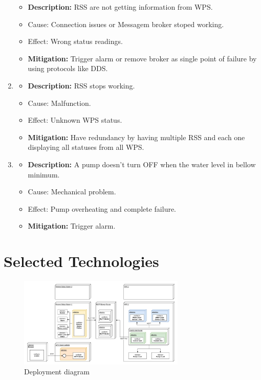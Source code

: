 \documentclass[11pt]{article}
\begin{document}
\begin{enumerate}[leftmargin=4em, font=\small, label=\textbf{H-\arabic*:}]
		\begin{itemize}
		\setlength\itemsep{0em}
    		\item \textbf{Description:} RSS are not getting information from WPS.
		\item Cause: Connection issues or Messagem broker stoped working.
    		\item Effect: Wrong status readings.
    		\item \textbf{Mitigation:} Trigger alarm or remove broker as single point of failure by using protocols like DDS.
		\end{itemize} 
	\item 
		\begin{itemize}
		\setlength\itemsep{0em}
    		\item \textbf{Description:} RSS stops working.
		\item Cause: Malfunction.
    		\item Effect: Unknown WPS status.
    		\item \textbf{Mitigation:} Have redundancy by having multiple RSS and each one displaying all statuses from all WPS.
		\end{itemize} 
	\item 
		\begin{itemize}
		\setlength\itemsep{0em}
    		\item \textbf{Description:} A pump doesn't turn OFF when the water level in bellow minimum.
		\item Cause: Mechanical problem.
    		\item Effect: Pump overheating and complete failure.
    		\item \textbf{Mitigation:} Trigger alarm.
		\end{itemize} 
\end{enumerate}

\newpage
\section{Selected Technologies}

\begin{figure}[H]
  \includegraphics[width=300px]{../diagrams/deployment-diagram-WPS.jpg}
  \caption{Deployment diagram}
  \label{fig:Deployment Diagram}
\end{figure}
\end{document}
